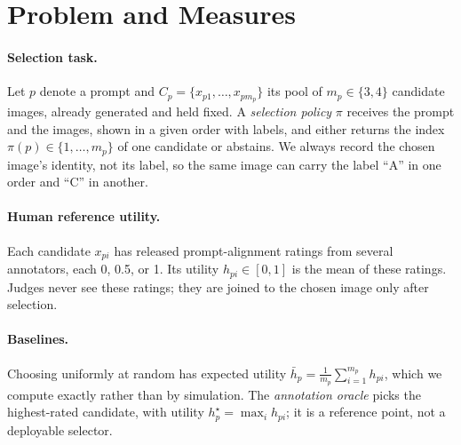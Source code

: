 \documentclass[letterpaper]{article}
\begin{document}
\section{Problem and Measures}
\label{sec:measures}
\paragraph{Selection task.} Let $p$ denote a prompt and $C_p=\{x_{p1},\ldots,x_{pm_p}\}$ its pool of $m_p\in\{3,4\}$ candidate images, already generated and held fixed. A \emph{selection policy} $\pi$ receives the prompt and the images, shown in a given order with labels, and either returns the index $\pi(p)\in\{1,\ldots,m_p\}$ of one candidate or abstains. We always record the chosen image's identity, not its label, so the same image can carry the label ``A'' in one order and ``C'' in another.

\paragraph{Human reference utility.} Each candidate $x_{pi}$ has released prompt-alignment ratings from several annotators, each 0, 0.5, or 1. Its utility $h_{pi}\in[0,1]$ is the mean of these ratings. Judges never see these ratings; they are joined to the chosen image only after selection.

\paragraph{Baselines.} Choosing uniformly at random has expected utility $\bar h_p=\frac{1}{m_p}\sum_{i=1}^{m_p} h_{pi}$, which we compute exactly rather than by simulation. The \emph{annotation oracle} picks the highest-rated candidate, with utility $h^\star_p=\max_i h_{pi}$; it is a reference point, not a deployable selector.
\end{document}

